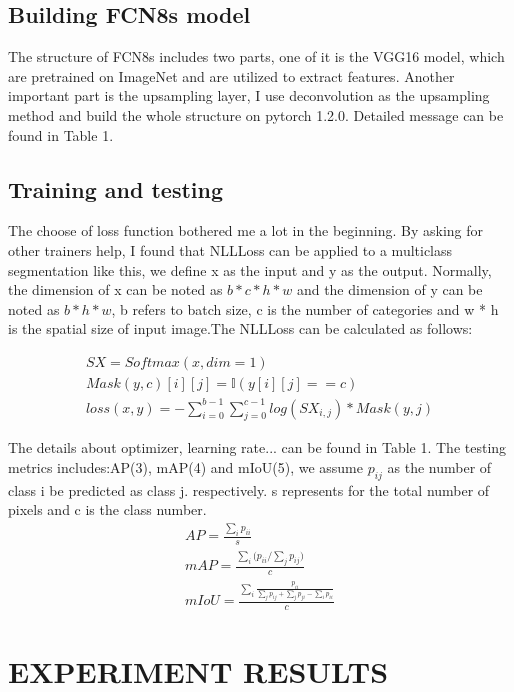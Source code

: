 \documentclass[transmag]{IEEEtran}
\begin{document}
\subsection{Building FCN8s model}
  The structure of FCN8s includes two parts, one of it is the VGG16 model\cite{2}, which are pretrained on 
  ImageNet\cite{3} and are utilized to extract features. Another important part is the upsampling layer, I use deconvolution as the
  upsampling method and build the whole structure on pytorch 1.2.0. Detailed message can be found in Table 1.
\subsection{Training and testing}
  The choose of loss function bothered me a lot in the beginning. By asking for other trainers help, I found that NLLLoss can be applied to 
  a multiclass segmentation like this, we define x as the input and y as the output. Normally, the dimension of x can be noted as $b * c * h * w$ and the dimension 
  of y can be noted as $b * h * w$, b refers to batch size, c is the number of categories and w * h is the spatial size of input image.The NLLLoss can be
  calculated as follows:

\begin{gather}
SX = Softmax(x, dim=1) \\
Mask(y, c)[i][j] = \mathbb{I}(y[i][j] == c)  \\
loss(x, y) = -\sum_{i=0}^{b-1} \sum_{j=0}^{c-1}{log(SX_{i,j}) * Mask(y, j)}
\end{gather}

The details about optimizer, learning rate... can be found in Table 1.
The testing metrics includes:AP(3), mAP(4) and mIoU(5), we assume $p_{ij}$ as the number of class i be predicted as class j.
respectively. s represents for the total number of pixels and c is the class number.
\begin{gather}
     AP  =  \frac{\sum_{i}p_{ii}} {s}              \\
     mAP = \frac{\sum_{i}{(p_{ii} / \sum_{j}p_{ij}})}{c}                     \\
     mIoU = \frac{\sum_{i}\frac{p_{ii}}{\sum_{j}p_{ij} + \sum_{j}p_{ji} - \sum_{i}p_{ii}    }}{c} 
\end{gather}


\section{EXPERIMENT RESULTS}
\end{document}
